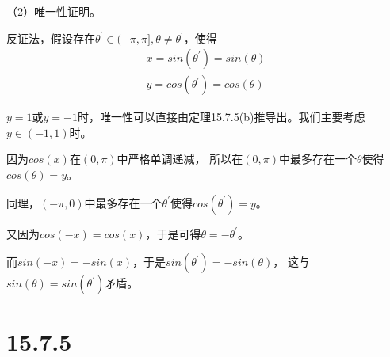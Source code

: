 \documentclass{article}
\begin{document}
（2）唯一性证明。

反证法，假设存在$\theta^\prime \in (-\pi, \pi], \theta \neq \theta^\prime$，使得
\begin{align*}
  x = sin(\theta^\prime) = sin(\theta) \\
  y = cos(\theta^\prime) = cos(\theta)
\end{align*}

$y = 1$或$ y = -1$时，唯一性可以直接由定理15.7.5(b)推导出。我们主要考虑$y \in (-1, 1)$时。

因为$cos(x)$在$(0, \pi)$中严格单调递减，
所以在$(0, \pi)$中最多存在一个$\theta$使得$cos(\theta) = y$。

同理，$(-\pi, 0)$中最多存在一个$\theta^\prime$使得$cos(\theta^\prime) = y$。

又因为$cos(-x) = cos(x)$，于是可得$\theta = -\theta^\prime$。

而$sin(-x) = -sin(x)$，于是$sin(\theta^\prime) = -sin(\theta)$，
这与$sin(\theta) = sin(\theta^\prime)$矛盾。

\section*{15.7.5}
\end{document}
